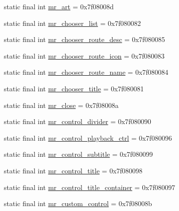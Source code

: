 \begin{CompactItemize}
\item 
static final int \hyperlink{classandroid_1_1support_1_1mediacompat_1_1_r_1_1id_08cd5553686466d6b052f988e825af35}{mr\_\-art} = 0x7f08008d
\item 
static final int \hyperlink{classandroid_1_1support_1_1mediacompat_1_1_r_1_1id_331261df4cbcef48bd2b1ad8df6366ea}{mr\_\-chooser\_\-list} = 0x7f080082
\item 
static final int \hyperlink{classandroid_1_1support_1_1mediacompat_1_1_r_1_1id_afcaefab20a9e7346b27f25cfdb89694}{mr\_\-chooser\_\-route\_\-desc} = 0x7f080085
\item 
static final int \hyperlink{classandroid_1_1support_1_1mediacompat_1_1_r_1_1id_4ff5025d466a9eed61d65d8f896eabc5}{mr\_\-chooser\_\-route\_\-icon} = 0x7f080083
\item 
static final int \hyperlink{classandroid_1_1support_1_1mediacompat_1_1_r_1_1id_69429bdff65a94abe7a907d1903570f2}{mr\_\-chooser\_\-route\_\-name} = 0x7f080084
\item 
static final int \hyperlink{classandroid_1_1support_1_1mediacompat_1_1_r_1_1id_4e216227a1329dea42ff8f071956a40a}{mr\_\-chooser\_\-title} = 0x7f080081
\item 
static final int \hyperlink{classandroid_1_1support_1_1mediacompat_1_1_r_1_1id_d146aeae9e7234b71dcfeda0b27ffbea}{mr\_\-close} = 0x7f08008a
\item 
static final int \hyperlink{classandroid_1_1support_1_1mediacompat_1_1_r_1_1id_0cde530dca5ab9b1303557c23a6c9f0b}{mr\_\-control\_\-divider} = 0x7f080090
\item 
static final int \hyperlink{classandroid_1_1support_1_1mediacompat_1_1_r_1_1id_ebf71005e6d6d9f9aaadcf78dcd2e306}{mr\_\-control\_\-playback\_\-ctrl} = 0x7f080096
\item 
static final int \hyperlink{classandroid_1_1support_1_1mediacompat_1_1_r_1_1id_32354d5b33a21ee147738225beba3e32}{mr\_\-control\_\-subtitle} = 0x7f080099
\item 
static final int \hyperlink{classandroid_1_1support_1_1mediacompat_1_1_r_1_1id_472622b67c7b95bbe495833360da0ed9}{mr\_\-control\_\-title} = 0x7f080098
\item 
static final int \hyperlink{classandroid_1_1support_1_1mediacompat_1_1_r_1_1id_e1c852eba0e64f5f7ece4e0e002e6c6a}{mr\_\-control\_\-title\_\-container} = 0x7f080097
\item 
static final int \hyperlink{classandroid_1_1support_1_1mediacompat_1_1_r_1_1id_4ba05ac038f4f32b9b141a1a73807406}{mr\_\-custom\_\-control} = 0x7f08008b
\item 

\end{CompactItemize}
